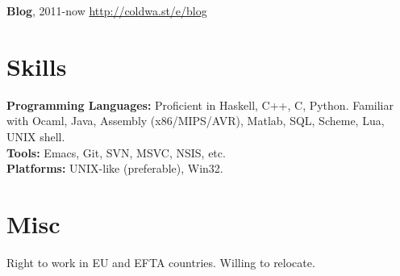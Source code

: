 \documentclass[margin,line]{res}
\begin{document}
\begin{resume}
{\bf Blog}, 2011-now \hfill \url{http://coldwa.st/e/blog}

\section{\sc Skills}

{\bf Programming Languages:} Proficient in Haskell, C++, C, Python. Familiar
with Ocaml, Java, Assembly (x86/MIPS/AVR), Matlab, SQL, Scheme, Lua, UNIX shell. \\
{\bf Tools:} Emacs, Git, SVN, MSVC, NSIS, etc.\\
{\bf Platforms:} UNIX-like (preferable), Win32.



\section{\sc Misc}

Right to work in EU and EFTA countries. Willing to relocate.

\end{resume}
\end{document}
